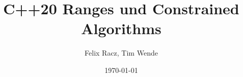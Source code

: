 \title{C++20 Ranges und Constrained Algorithms}
\author{Felix Racz, Tim Wende}
\date{\today}
\subject{Advanced C++}





